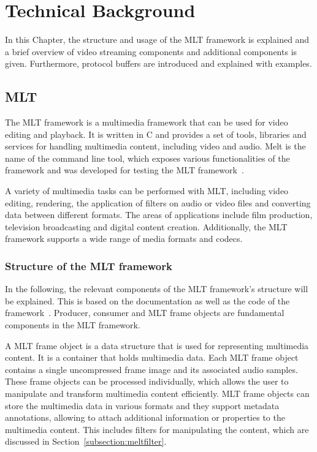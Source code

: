 \documentclass[../MasterThesis.tex]{subfiles}
\begin{document}
	
	

\newpage

\section{Technical Background} \label{section:technicalbackground}


In this Chapter, the structure and usage of the MLT framework is explained and a brief overview of video streaming components and additional components is given. Furthermore, protocol buffers are introduced and explained with examples.


\subsection{MLT} \label{subsection:melt}

The MLT framework is a multimedia framework that can be used for video editing and playback. It is written in C and provides a set of tools, libraries and services for handling multimedia content, including video and audio. Melt is the name of the command line tool, which exposes various functionalities of the framework and was developed for testing the MLT framework~\cite{melt, melt_cli}. 




A variety of multimedia tasks can be performed with MLT, including video editing, rendering, the application of filters on audio or video files and converting data between different formats.
The areas of applications include film production, television broadcasting and digital content creation. 
Additionally, the MLT framework supports a wide range of media formats and codecs.




\subsubsection*{Structure of the MLT framework}


In the following, the relevant components of the MLT framework's structure will be explained. This is based on the documentation as well as the code of the framework~\cite{melt, melt_code}.
%
Producer, consumer and MLT frame objects are fundamental components in the MLT framework.

A MLT frame object is a data structure that is used for representing multimedia content. 
It is a container that holds multimedia data. Each MLT frame object contains a single uncompressed frame image and its associated audio samples. These frame objects can be processed individually, which allows the user to manipulate and transform multimedia content efficiently.
MLT frame objects can store the multimedia data in various formats and they support metadata annotations, allowing to attach additional information or properties to the multimedia content. This includes filters for manipulating the content, which are discussed in Section~\ref{subsection:meltfilter}.
\end{document}
